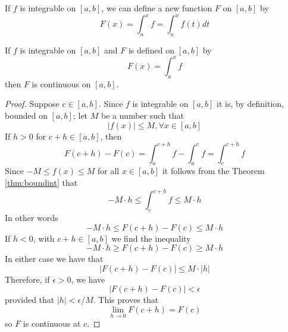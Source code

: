 \begin{rmk}
    If $f$ is integrable on $[a,b]$, we can define a new function $F$ on $[a,b]$ by \begin{equation}
        F(x) = \int_a^xf = \int_a^xf(t)dt
    \end{equation}
\end{rmk}


\begin{thm}
    If $f$ is integrable on $[a,b]$ and $F$ is defined on $[a,b]$ by \begin{equation*}
        F(x) = \int_a^xf
    \end{equation*}
    then $F$ is continuous on $[a,b]$.
\end{thm}
\begin{proof}
    Suppose $c \in [a,b]$. Since $f$ is integrable on $[a,b]$ it is, by definition, bounded on $[a,b]$; let $M$ be a number such that \begin{equation*}
        |f(x)| \leq M,\forall x \in [a,b]
    \end{equation*}
    If $h > 0$ for $c+h \in [a,b]$, then \begin{equation*}
        F(c+h) - F(c) = \int_a^{c+h}f - \int_a^cf = \int_c^{c+h}f
    \end{equation*}
    Since $-M \leq f(x) \leq M$ for all $x \in [a,b]$ it follows from the Theorem \ref{thm:boundint} that \begin{equation*}
        -M\cdot h \leq \int_c^{c+h}f \leq M\cdot h
    \end{equation*}
    In other words \begin{equation*}
        -M\cdot h \leq F(c+h) - F(c) \leq M\cdot h
    \end{equation*}
    If $h < 0$, with $c+h \in [a,b]$ we find the inequality \begin{equation*}
        -M\cdot h \geq F(c+h) - F(c) \geq M\cdot h
    \end{equation*}
    In either case we have that \begin{equation*}
        |F(c+h) - F(c)| \leq M\cdot |h|
    \end{equation*}
    Therefore, if $\epsilon > 0$, we have \begin{equation*}
        |F(c+h) - F(c)| < \epsilon
    \end{equation*}
    provided that $|h| < \epsilon/M$. This proves that \begin{equation*}
        \lim\limits_{h\rightarrow 0}F(c+h) = F(c)
    \end{equation*}
    so $F$ is continuous at $c$.
\end{proof}

